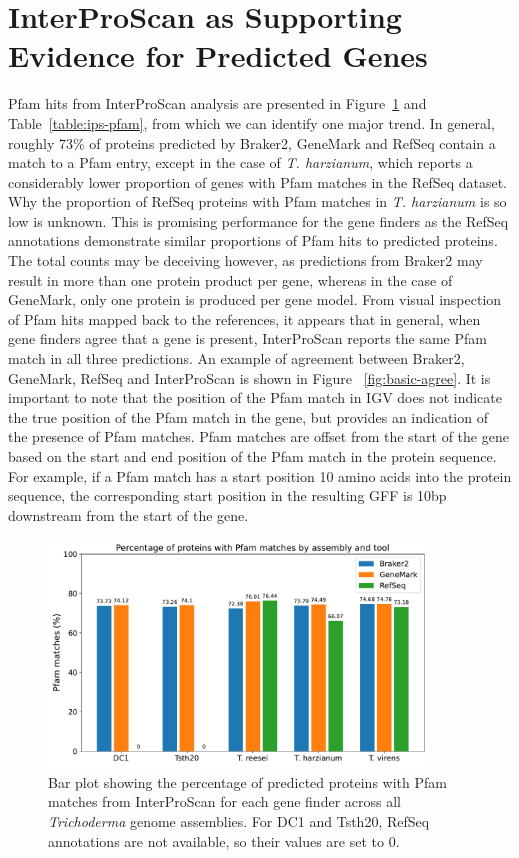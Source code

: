 \section{InterProScan as Supporting Evidence for Predicted Genes}\label{section:interproscan}

Pfam hits from InterProScan analysis are presented in
Figure~\ref{fig:ips-counts} and Table~\ref{table:ips-pfam}, from
which we can identify one major trend. In general, roughly 73\% of
proteins predicted by Braker2, GeneMark and RefSeq contain a match to
a Pfam entry, except in the case of \textit{T. harzianum}, which
reports a considerably lower proportion of genes with Pfam matches in
the RefSeq dataset. Why the proportion of RefSeq proteins with Pfam
matches in \textit{T. harzianum} is so low is unknown. This is
promising performance for the gene finders as the RefSeq annotations
demonstrate similar proportions of Pfam hits to predicted
proteins. The total counts may be deceiving however, as predictions
from Braker2 may result in more than one protein product per gene,
whereas in the case of GeneMark, only one protein is produced per gene
model. From visual inspection of Pfam hits mapped back to the
references, it appears that in general, when gene finders agree that a
gene is present, InterProScan reports the same Pfam match in all three
predictions. An example of agreement between Braker2, GeneMark, RefSeq
and InterProScan is shown in Figure ~\ref{fig:basic-agree}. It is
important to note that the position of the Pfam match in IGV does not
indicate the true position of the Pfam match in the gene, but provides
an indication of the presence of Pfam matches. Pfam matches are offset
from the start of the gene based on the start and end position of the
Pfam match in the protein sequence. For example, if a Pfam match has a
start position 10 amino acids into the protein sequence, the
corresponding start position in the resulting GFF is 10bp downstream
from the start of the gene.

\begin{figure}
  \centering
  \includegraphics[width=0.90\textwidth]{figures/interproscan-barplot.pdf}
  \caption[Percentage of proteins with Pfam matches]{Bar plot showing the percentage of predicted proteins with Pfam matches from InterProScan for each gene finder across all \textit{Trichoderma} genome assemblies. For DC1 and Tsth20, RefSeq annotations are not available, so their values are set to 0.}\label{fig:ips-counts}
\end{figure}

